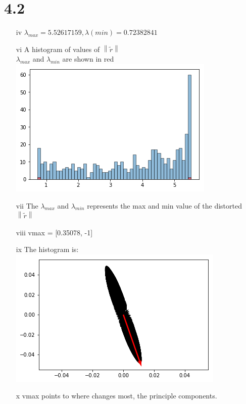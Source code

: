 \documentclass[12pt]{article}
\begin{document}
\section*{4.2}
\begin{enumerate}
\item[iv]
$\lambda_{max} = 5.52617159, \lambda(min) = 0.72382841$\\

\item[vi]
A histogram of values of $\left \| \widetilde{r} \right \|$ \\
$\lambda_{max}$ and $ \lambda_{min} $ are shown in red\\
\includegraphics[scale=0.6]{4.png}

\item[vii]
The $\lambda_{max} $ and $\lambda_{min}$ represents the max and min value of the distorted $\left \| \widetilde{r} \right \|$ \\

\item[viii]
vmax = [0.35078, -1]\\

\item[ix]
The histogram is:\\
\includegraphics[scale=0.6]{5.png}

\item[x]
vmax points to where changes most, the principle components.

\end{enumerate}


\end{document}
